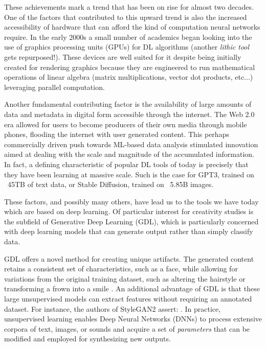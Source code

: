 These achievements mark a trend that has been on rise for almost two decades. One of the factors that contributed to this upward trend is also the increased accessibility of hardware that can afford the kind of computation neural networks require. In the early 2000s a small number of academics began looking into the use of graphics processing units (GPUs) for DL algorithms (another \emph{lithic tool} gets repurposed!). These devices are well suited for it despite being initially created for rendering graphics because they are engineered to run mathematical operations of linear algebra (matrix multiplications, vector dot products, etc...) leveraging parallel computation.

Another fundamental contributing factor is the availability of large amounts of data and metadata in digital form accessible through the internet. The Web 2.0 era allowed for users to become producers of their own media through mobile phones, flooding the internet with user generated content. This perhaps commercially driven push towards ML-based data analysis stimulated innovation aimed at dealing with the scale and magnitude of the accumulated information. In fact, a defining characteristic of popular DL tools of today is precisely that they have been learning at massive scale. Such is the case for GPT3, trained on ~45TB of text data, or Stable Diffusion, trained on ~5.85B images.

These factors, and possibly many others, have lead us to the tools we have today which are based on deep learning. Of particular interest for creativity studies is the subfield of Generative Deep Learning (GDL), which is particularly concerned with deep learning models that can generate output rather than simply classify data.

GDL offers a novel method for creating unique artifacts. The generated content retains a consistent set of characteristics, such as a face, while allowing for variations from the original training dataset, such as altering the hairstyle or transforming a frown into a smile \citep{Pumarola2019}. An additional advantage of GDL is that these large unsupervised models can extract features without requiring an annotated dataset. For instance, the authors of StyleGAN2 assert: . In practice, unsupervised learning enables Deep Neural Networks (DNNs) to process extensive corpora of text, images, or sounds and acquire a set of \emph{parameters} that can be modified and employed for synthesizing new outputs.

